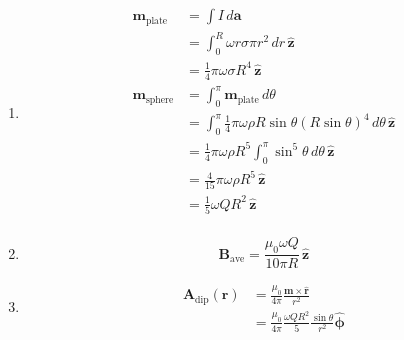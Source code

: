 \documentclass{article}
\renewcommand{\vec}[1]{\boldsymbol{\mathbf{#1}}}
\newcommand{\uvec}[1]{\hat{\vec{#1}}}
\begin{document}
\setcounter{subsection}{59}
\subsection{}

\begin{enumerate}
  \item

        \begin{align*}
          \vec{m}_\text{plate}  & = \int I \,d \vec{a}                                                                           \\
                                & = \int_0^R \omega r \sigma \pi r^2 \,d r \,\uvec{z}                                            \\
                                & = \frac{1}{4} \pi \omega \sigma R^4 \,\uvec{z}                                                 \\
          \vec{m}_\text{sphere} & = \int_0^\pi \vec{m}_\text{plate} \,d \theta                                                   \\
                                & = \int_0^\pi \frac{1}{4} \pi \omega \rho R \sin \theta (R \sin \theta)^4 \,d \theta \,\uvec{z} \\
                                & = \frac{1}{4} \pi \omega \rho R^5 \int_0^\pi \sin^5 \theta \,d \theta \,\uvec{z}               \\
                                & = \frac{4}{15} \pi \omega \rho R^5 \,\uvec{z}                                                  \\
                                & = \frac{1}{5} \omega Q R^2 \,\uvec{z}                                                          \\
        \end{align*}

  \item

        \[\vec{B}_\text{ave} = \frac{\mu_0 \omega Q}{10 \pi R} \,\uvec{z}\]

  \item

        \begin{align*}
          \vec{A}_\text{dip}(\vec{r}) & = \frac{\mu_0}{4 \pi} \frac{\vec{m} \times \uvec{r}}{r^2}                        \\
                                      & = \frac{\mu_0}{4 \pi} \frac{\omega Q R^2}{5} \frac{\sin \theta}{r^2} \uvec{\phi}
        \end{align*}
\end{enumerate}
\end{document}
